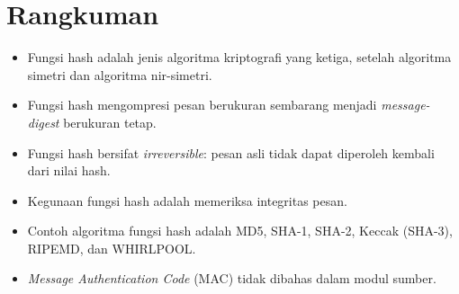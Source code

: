 \section{Rangkuman}
\begin{itemize}
    \item Fungsi hash adalah jenis algoritma kriptografi yang ketiga, setelah
          algoritma simetri dan algoritma nir-simetri.
    \item Fungsi hash mengompresi pesan berukuran sembarang menjadi
          \textit{message-digest} berukuran tetap.
    \item Fungsi hash bersifat \textit{irreversible}: pesan asli tidak dapat
          diperoleh kembali dari nilai hash.
    \item Kegunaan fungsi hash adalah memeriksa integritas pesan.
    \item Contoh algoritma fungsi hash adalah MD5, SHA-1, SHA-2, Keccak (SHA-3),
          RIPEMD, dan WHIRLPOOL.
    \item \textit{Message Authentication Code} (MAC) tidak dibahas dalam modul
          sumber.
\end{itemize}
